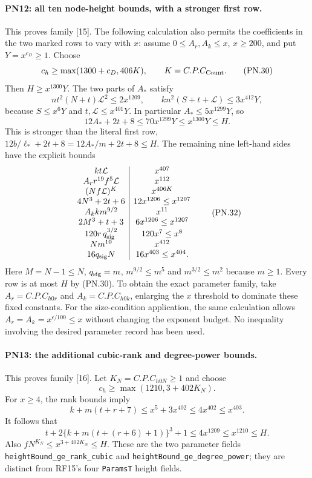 \documentclass[11pt,a4paper]{article}
\numberwithin{equation}{section}
\theoremstyle{remark}\newtheorem{remark}[theorem]{Remark}
\begin{document}
\paragraph{PN12: all ten node-height bounds, with a stronger first row.}
This proves family [15]. The following calculation also permits the
coefficients in the two marked rows to vary with $x$: assume
$0\leq A_r,A_k\leq x$, $x\geq200$, and put $Y=x^{c_D}\geq1$.
Choose
\[
                  c_h\geq\max(1300+c_D,406K),
                  \qquad K=C.P.C_{\rm Count}.                \tag{PN.30}
\]
Then $H\geq x^{1300}Y$. The two parts of $A_*$ satisfy
\[
 nt^2(N+t)\mathcal L^2\leq2x^{1209},\qquad
 kn^2(S+t+\mathcal L)\leq3x^{412}Y,
\]
because $S\leq x^6Y$ and $t,\mathcal L\leq x^{401}Y$.
In particular $A_*\leq5x^{1299}Y$, so
\[
 12A_*+2t+8\leq70x^{1299}Y\leq x^{1300}Y\leq H.
                                                               \tag{PN.31}
\]
This is stronger than the literal first row,
$12b/\ell_*+2t+8=12A_*/m+2t+8\leq H$.
The remaining nine left-hand sides have the explicit bounds
\[
\begin{array}{c|c}
 kt\mathcal L&x^{407}\\
 A_r r^{19}f^5\mathcal L&x^{112}\\
 (Nf\mathcal L)^K&x^{406K}\\
 4N^3+2t+6&12x^{1206}\leq x^{1207}\\
 A_k k m^{9/2}&x^{11}\\
 2M^3+t+3&6x^{1206}\leq x^{1207}\\
 120r\,q_{\rm sig}^{3/2}&120x^7\leq x^8\\
 Nm^{10}&x^{412}\\
 16q_{\rm sig}N&16x^{403}\leq x^{404}.
\end{array}                                                   \tag{PN.32}
\]
Here $M=N-1\leq N$, $q_{\rm sig}=m$,
$m^{9/2}\leq m^5$ and $m^{3/2}\leq m^2$ because $m\geq1$.
Every row is at most $H$ by (PN.30). To obtain the exact parameter
family, take $A_r=C.P.C_{h0r}$ and $A_k=C.P.C_{h0k}$, enlarging the
$x$ threshold to dominate these fixed constants. For the size-condition
application, the same calculation allows
$A_r=A_k=x^{\epsilon/100}\leq x$ without changing the exponent budget.
No inequality involving the desired parameter record has been used.

\paragraph{PN13: the additional cubic-rank and degree-power bounds.}
This proves family [16]. Let $K_N=C.P.C_{h0N}\geq1$ and choose
\[
                   c_h\geq\max(1210,3+402K_N).
                                                               \tag{PN.33}
\]
For $x\geq4$, the rank bounds imply
\[
 k+m(t+r+7)\leq x^5+3x^{402}\leq4x^{402}\leq x^{403}.
\]
It follows that
\[
 t+2\{k+m(t+(r+6)+1)\}^3+1
       \leq4x^{1209}\leq x^{1210}\leq H.                   \tag{PN.34}
\]
Also $fN^{K_N}\leq x^{3+402K_N}\leq H$.
These are the two parameter fields
\texttt{heightBound\_\allowbreak ge\_\allowbreak rank\_\allowbreak cubic} and
\texttt{heightBound\_\allowbreak ge\_\allowbreak degree\_\allowbreak power}; they are distinct from
RF15's four \texttt{ParamsT} height fields.
\end{document}
